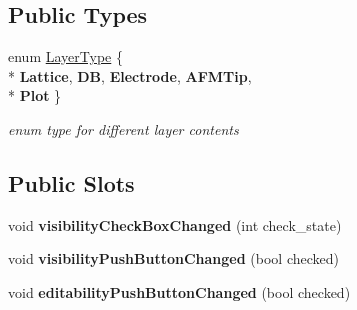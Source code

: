 \subsection*{Public Types}
\begin{DoxyCompactItemize}
\item 
enum \hyperlink{classprim_1_1Layer_a9a9c22ae767c4671a07293b69c540547}{Layer\+Type} \{ \\*
{\bfseries Lattice}, 
{\bfseries DB}, 
{\bfseries Electrode}, 
{\bfseries A\+F\+M\+Tip}, 
\\*
{\bfseries Plot}
 \}\hypertarget{classprim_1_1Layer_a9a9c22ae767c4671a07293b69c540547}{}\label{classprim_1_1Layer_a9a9c22ae767c4671a07293b69c540547}
\begin{DoxyCompactList}\small\item\em enum type for different layer contents \end{DoxyCompactList}
\end{DoxyCompactItemize}
\subsection*{Public Slots}
\begin{DoxyCompactItemize}
\item 
void {\bfseries visibility\+Check\+Box\+Changed} (int check\+\_\+state)\hypertarget{classprim_1_1Layer_a107df2ecd3c62a8a2850ab16b259cd97}{}\label{classprim_1_1Layer_a107df2ecd3c62a8a2850ab16b259cd97}

\item 
void {\bfseries visibility\+Push\+Button\+Changed} (bool checked)\hypertarget{classprim_1_1Layer_aff089bee001dceb4a6ef0d8bdc46c18b}{}\label{classprim_1_1Layer_aff089bee001dceb4a6ef0d8bdc46c18b}

\item 
void {\bfseries editability\+Push\+Button\+Changed} (bool checked)\hypertarget{classprim_1_1Layer_aadf868aa24684752991db0354f01fed9}{}\label{classprim_1_1Layer_aadf868aa24684752991db0354f01fed9}

\end{DoxyCompactItemize}
